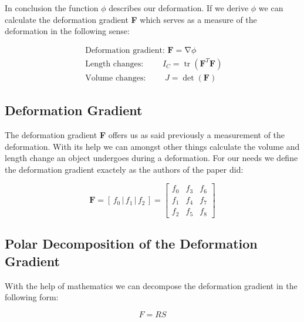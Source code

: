 In conclusion the function $\phi$ describes our deformation. If we derive $\phi$ we can calculate the deformation gradient \textbf{F} which serves as a measure of the deformation in the following sense: 

\[
\begin{array}{l}
{\text { Deformation gradient: }} {\mathbf{F}=\operatorname{\nabla} \phi}
\\
{\text { Length changes: }} {\qquad I_{C}=\operatorname{tr}\left(\mathbf{F}^{T} \mathbf{F}\right)} 
\\ 
{\text { Volume changes: }} {\qquad J=\operatorname{det}(\mathbf{F})}\end{array}
\]



\subsection{Deformation Gradient}
The deformation gradient \textbf{F} offers us as said previously a measurement of the deformation. With its help we can amongst other things calculate the volume and length change an object undergoes during a deformation. For our needs we define the deformation gradient exactely as the authors of the paper \cite{Smith:2018:SNF:3191713.3180491} did:

\[
\textbf{F} = \left[ \,f_0\, \bigg| \,f_1\, \bigg| \,f_2\, \right] = \begin{bmatrix} f_0 & f_3 & f_6 \\ f_1 & f_4 & f_7 \\ f_2 & f_5 & f_8 \end{bmatrix}
\]



\subsection{Polar Decomposition of the Deformation Gradient}
With the help of mathematics we can decompose the deformation gradient in the following form:

\[
F = R S
\]




